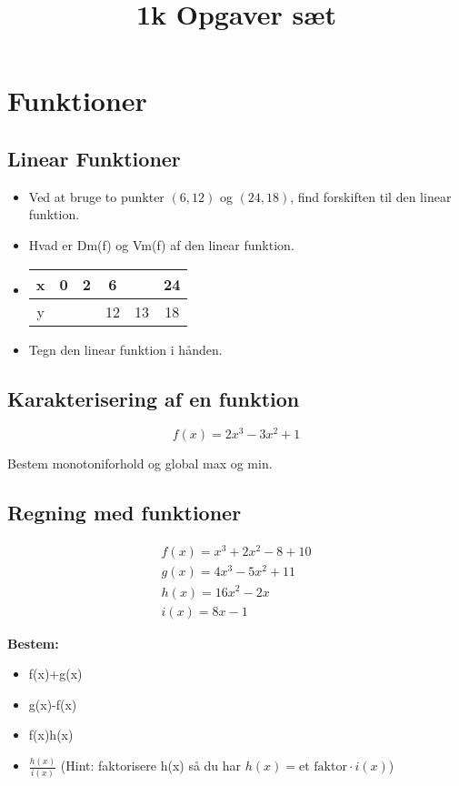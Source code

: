 \documentclass[10pt,a4paper]{article}
\begin{document}
	\title{1k Opgaver sæt}
	\maketitle
	
\section{Funktioner}
\subsection{Linear Funktioner}
\begin{itemize}
	\item Ved at bruge to punkter $(6,12)$ og $(24,18)$, find forskiften til den linear funktion.
	\item Hvad er Dm(f) og Vm(f) af den linear funktion.
	\item \begin{tabular}{|c|c|c|c|c|c|}
		\hline 
		x & 0 & 2 & 6 &  & 24 \\ 
		\hline 
		y &  &  & 12 & 13 & 18 \\ 
		\hline 
	\end{tabular}
	\item Tegn den linear funktion i hånden. 
\end{itemize}

\subsection{Karakterisering af en funktion}

\begin{equation*}
f(x)=2x^3-3x^2+1
\end{equation*}

Bestem monotoniforhold og global max og min.

\subsection{Regning med funktioner}

\begin{align*}
f(x)=x^3+2x^2-8+10\\
g(x)=4x^3-5x^2+11\\
h(x)=16x^2-2x\\
i(x)=8x-1
\end{align*}

\textbf{Bestem:}
\begin{itemize}
	\item f(x)+g(x)
	\item g(x)-f(x)
	\item f(x)h(x)
	\item $\frac{h(x)}{i(x)}$ (Hint: faktorisere h(x) så du har $h(x) = \text{et faktor} \cdot i(x)$)
\end{itemize}
\end{document}
